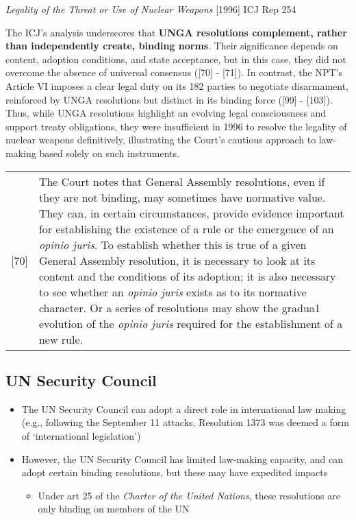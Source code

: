 \begin{casedetails}{\textit{Legality of the Threat or Use of Nuclear Weapons} [1996] ICJ Rep 254}
    \vspace{\baselineskip}
    
    The ICJ's analysis underscores that \textbf{UNGA resolutions complement, rather than independently create, binding norms}. Their significance depends on content, adoption conditions, and state acceptance, but in this case, they did not overcome the absence of universal consensus ([70] - [71]). In contrast, the NPT's Article VI imposes a clear legal duty on its 182 parties to negotiate disarmament, reinforced by UNGA resolutions but distinct in its binding force ([99] - [103]). Thus, while UNGA resolutions highlight an evolving legal consciousness and support treaty obligations, they were insufficient in 1996 to resolve the legality of nuclear weapons definitively, illustrating the Court's cautious approach to law-making based solely on such instruments.

    \begin{longtable}{r|>{\raggedright\arraybackslash}p{}}
        [70] & The Court notes that General Assembly resolutions, even if they are not binding, may sometimes have normative value. They can, in certain circumstances, provide evidence important for establishing the existence of a rule or the emergence of an \textit{opinio juris}. To establish whether this is true of a given General Assembly resolution, it is necessary to look at its content and the conditions of its adoption; it is also necessary to see whether an \textit{opinio juris} exists as to its normative character. Or a series of resolutions may show the gradua1 evolution of the \textit{opinio juris} required for the establishment of a new rule. 
    \end{longtable}
\end{casedetails}

\subsection{UN Security Council}
\begin{itemize}
    \item The UN Security Council can adopt a direct role in international law making (e.g., following the September 11 attacks, Resolution 1373 was deemed a form of `international legislation')
    \item However, the UN Security Council has limited law-making capacity, and can adopt certain binding resolutions, but these may have expedited impacts
    \begin{itemize}
        \item Under art 25 of the \textit{Charter of the United Nations}, these resolutions are only binding on members of the UN
    \end{itemize}
\end{itemize}

